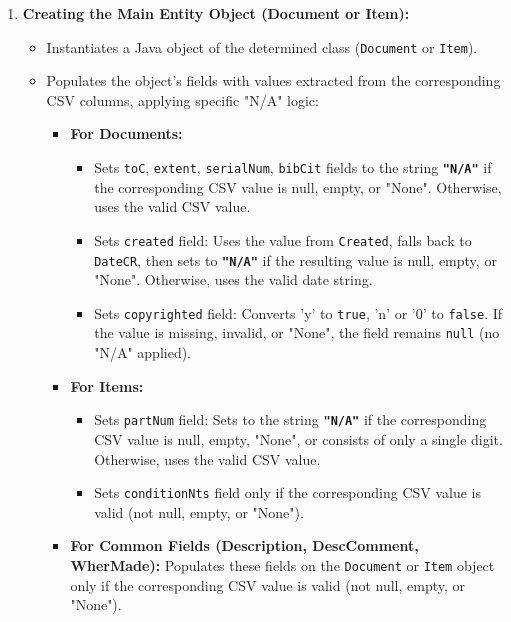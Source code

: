 \documentclass[11pt, a4paper]{article}
\begin{document}
\begin{enumerate}
    \item \textbf{Creating the Main Entity Object (Document or Item):}
        \begin{itemize}
            \item Instantiates a Java object of the determined class (\texttt{Document} or \texttt{Item}).
            \item Populates the object's fields with values extracted from the corresponding CSV columns, applying specific "N/A" logic:
                \begin{itemize}
                    \item \textbf{For Documents:}
                        \begin{itemize}
                        \item Sets \texttt{toC}, \texttt{extent}, \texttt{serialNum}, \texttt{bibCit} fields to the string \textbf{\texttt{"N/A"}} if the corresponding CSV value is null, empty, or "None". Otherwise, uses the valid CSV value.
                        \item Sets \texttt{created} field: Uses the value from \texttt{Created}, falls back to \texttt{DateCR}, then sets to \textbf{\texttt{"N/A"}} if the resulting value is null, empty, or "None". Otherwise, uses the valid date string.
                        \item Sets \texttt{copyrighted} field: Converts 'y' to \texttt{true}, 'n' or '0' to \texttt{false}. If the value is missing, invalid, or "None", the field remains \texttt{null} (no "N/A" applied).
                        \end{itemize}
                    \item \textbf{For Items:}
                        \begin{itemize}
                        \item Sets \texttt{partNum} field: Sets to the string \textbf{\texttt{"N/A"}} if the corresponding CSV value is null, empty, "None", or consists of only a single digit. Otherwise, uses the valid CSV value.
                        \item Sets \texttt{conditionNts} field only if the corresponding CSV value is valid (not null, empty, or "None"). 
                        \end{itemize}
                    \item \textbf{For Common Fields (Description, DescComment, WherMade):} Populates these fields on the \texttt{Document} or \texttt{Item} object only if the corresponding CSV value is valid (not null, empty, or "None").
                \end{itemize}
        \end{itemize}


\end{enumerate}
\end{document}
